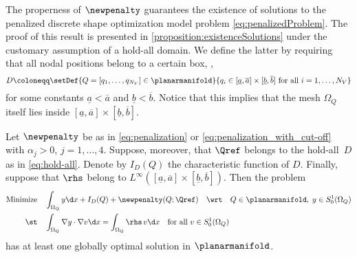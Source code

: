 The properness of $\newpenalty$ guarantees the existence of solutions to the penalized discrete shape optimization  model problem \eqref{eq:penalizedProblem}.
The proof of this result is presented in \cref{proposition:existenceSolutions} under the customary assumption of a hold-all domain.
We define the latter by requiring that all nodal positions belong to a certain box, \ie,
\begin{equation}
	\label{eq:hold-all}
	D
	\coloneqq
	\setDef{Q = [q_1,\ldots, q_{N_V}]\in \planarmanifold}{q_i \in [\underline{a},\overline{a}]\times [\underline{b},\overline{b}] \text{ for all } i = 1,\ldots, N_V}
\end{equation}
for some constants $\underline{a} < \overline{a}$ and $\underline{b} < \overline{b}$.
Notice that this implies that the mesh $\Omega_Q$ itself lies inside $[\underline{a},\overline{a}] \times [\underline{b},\overline{b}]$.
\begin{proposition}
	\label{proposition:existenceSolutions}
	Let $\newpenalty$ be as in \eqref{eq:penalization} or \eqref{eq:penalization_with_cut-off} with $\alpha_j > 0$, $j = 1,\ldots,4$.
	Suppose, moreover, that $\Qref$ belongs to the hold-all~$D$ as in \eqref{eq:hold-all}.
	Denote by $I_D(Q)$ the characteristic function of $D$.
	Finally, suppose that $\rhs$ belong to $L^\infty([\underline{a},\overline{a}]\times [\underline{b},\overline{b}])$.
	Then the problem
	\begin{equation}
		\label{eq:penalizedProblem_withCharacteristicFunction}
		\begin{aligned}
			\text{Minimize}
			&
			\quad
			\int_{\Omega_Q} y \d x
			+
			I_D(Q)
			+
			\newpenalty(Q;\Qref)
			\quad
			\text{\wrt}
			\quad
			Q \in \planarmanifold
			,
			\;
			y \in S^1_0(\Omega_Q)
			\\
			\text{\st}
			&
			\quad
			\int_{\Omega_Q} \nabla y \cdot \nabla v \d x
			=
			\int_{\Omega_Q} \rhs \, v \d x
			\quad
			\text{for all }
			v \in S^1_0(\Omega_Q)
		\end{aligned}
	\end{equation}
	has at least one globally optimal solution in $\planarmanifold$.
\end{proposition}
